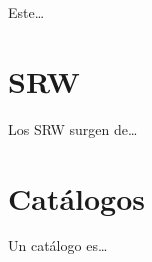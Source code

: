 Este\ldots




\section*{SRW}
\label{sec:argumentacion:SRW}
Los SRW surgen de\ldots





\section*{Catálogos}
\label{sec:argumentacion:catalogos}
Un catálogo es\ldots
